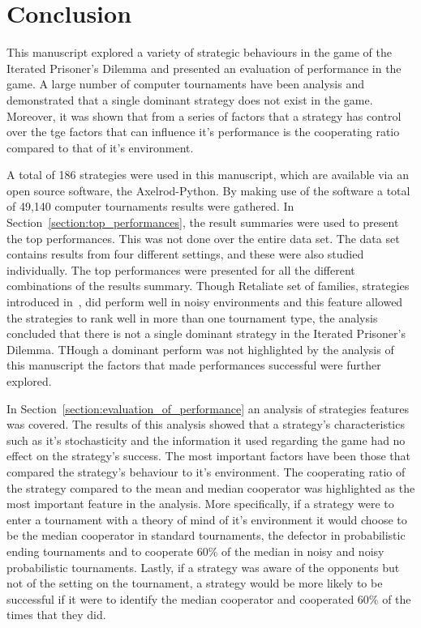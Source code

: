 \documentclass{article}
\begin{document}
\section{Conclusion}\label{section:conclusion}

This manuscript explored a variety of strategic behaviours in the game of the
Iterated Prisoner's Dilemma and presented an evaluation of performance in the
game. A large number of computer tournaments have been analysis and demonstrated
that a single dominant strategy does not exist in the game. Moreover, it
was shown that from a series of factors that a strategy has control over the
tge factors that can influence it's performance is the cooperating ratio compared
to that of it's environment.

A total of 186 strategies were used in this manuscript, which are available via
an open source software, the Axelrod-Python. By making use of the software a
total of 49,140 computer tournaments results were gathered. In
Section~\ref{section:top_performances}, the result summaries were used to
present the top performances. This was not done over the entire data set. The
data set contains results from four different settings, and these were also
studied individually. The top performances were presented for all the different
combinations of the results summary. Though Retaliate set of families,
strategies introduced in~\cite{axelrodproject}, did perform well in noisy
environments and this feature allowed the strategies to rank well in more than
one tournament type, the analysis concluded that there is not a single dominant
strategy in the Iterated Prisoner's Dilemma. THough a dominant perform
was not highlighted by the analysis of this manuscript the factors that made
performances successful were further explored.

In Section~\ref{section:evaluation_of_performance} an analysis of strategies
features was covered. The results of this analysis showed that a strategy's
characteristics such as it's stochasticity and the information it used regarding
the game had no effect on the strategy's success. The most important
factors have been those that compared the strategy's behaviour to it's environment.
The cooperating ratio of the strategy compared to the mean and median cooperator
was highlighted as the most important feature in the analysis. More specifically,
if a strategy were to enter a tournament with a theory of mind of it's environment
it would choose to be the median cooperator in standard tournaments, the
defector in probabilistic ending tournaments and to cooperate 60\% of the median
in noisy and noisy probabilistic tournaments. Lastly, if a strategy was
aware of the opponents but not of the setting on the tournament, a strategy
would be more likely to be successful if it were to identify the median
cooperator and cooperated 60\% of the times that they did.
\end{document}
